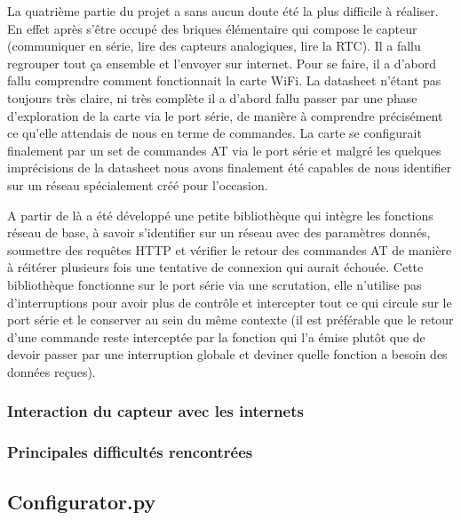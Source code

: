 		\par
		La quatrième partie du projet a sans aucun doute été la plus difficile à réaliser. En
		effet après s'être occupé des briques élémentaire qui compose le capteur (communiquer
		en série, lire des capteurs analogiques, lire la RTC). Il a fallu regrouper tout ça
		ensemble et l'envoyer sur internet. Pour se faire, il a d'abord fallu comprendre comment
		fonctionnait la carte WiFi. La datasheet n'étant pas toujours très claire, ni très complète
		il a d'abord fallu passer par une phase \og{} d'exploration \fg{} de la carte via le port
		série, de manière à comprendre précisément ce qu'elle attendais de nous en terme de commandes.
		La carte se configurait finalement par un set de commandes AT via le port série et malgré
		les quelques imprécisions de la datasheet nous avons finalement été capables de nous identifier
		sur un réseau spécialement créé pour l'occasion.
		
		\par
		A partir de là a été développé une petite bibliothèque qui intègre les fonctions réseau de base,
		à savoir s'identifier sur un réseau avec des paramètres donnés, soumettre des requêtes HTTP et
		vérifier le retour des commandes AT de manière à réitérer plusieurs fois une tentative de connexion
		qui aurait échouée. Cette bibliothèque fonctionne sur le port série via une scrutation, elle n'utilise
		pas d'interruptions pour avoir plus de contrôle et intercepter tout ce qui circule sur le port série
		et le conserver au sein du même contexte (il est préférable que le retour d'une commande reste interceptée
		par la fonction qui l'a émise plutôt que de devoir passer par une interruption globale et deviner
		quelle fonction a besoin des données reçues).
		
		\subsubsection{Interaction du capteur avec les internets}
		
		\subsubsection{Principales difficultés rencontrées}
		
	\subsection{Configurator.py}
	
